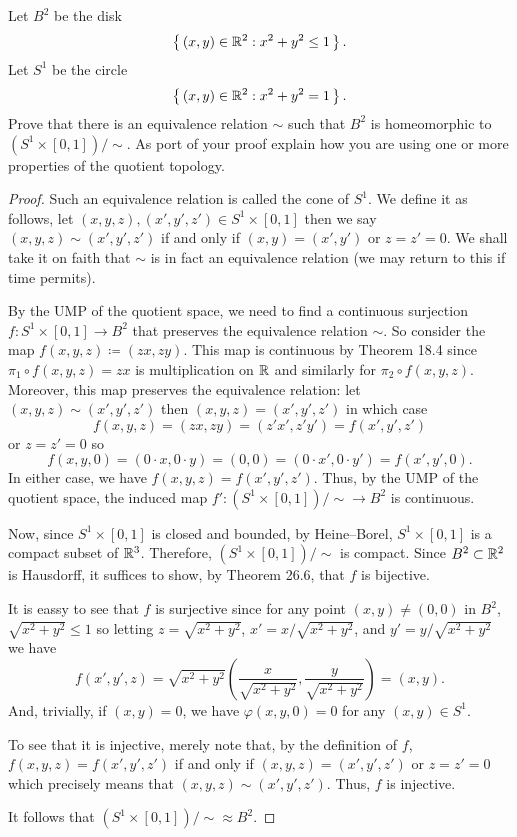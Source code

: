 \begin{problem}
Let $B^2$ be the disk
\[
\left\{\,(x,y)\in\mathbb{R}^2:x^2+y^2\leq 1\,\right\}.
\]
Let $S^1$ be the circle
\[
\left\{\,(x,y)\in\mathbb{R}^2:x^2+y^2=1\,\right\}.
\]
Prove that there is an equivalence relation $\sim$ such that $B^2$ is
homeomorphic to $(S^1\times[0,1])/{\sim}$. As port of your proof explain
how you are using one or more properties of the quotient topology.
\end{problem}
\begin{proof}
Such an equivalence relation is called the cone of $S^1$. We define it as
follows, let $(x,y,z),(x',y',z')\in S^1\times[0,1]$ then we say
$(x,y,z)\sim(x',y',z')$ if and only if $(x,y)=(x',y')$ or $z=z'=0$. We
shall take it on faith that $\sim$ is in fact an equivalence relation (we
may return to this if time permits).

By the UMP of the quotient space, we need to find a continuous surjection
$f\colon S^1\times[0,1]\to B^2$ that preserves the equivalence relation
$\sim$. So consider the map $f(x,y,z)\coloneqq(zx,zy)$. This map is
continuous by Theorem 18.4 since $\pi_1\circ f(x,y,z)=zx$ is multiplication
on $\mathbb{R}$ and similarly for $\pi_2\circ f(x,y,z)$. Moreover, this map
preserves the equivalence relation: let $(x,y,z)\sim(x',y',z')$ then
$(x,y,z)=(x',y',z')$ in which case
\[
f(x,y,z)=(zx,zy)=(z'x',z'y')=f(x',y',z')
\]
or $z=z'=0$ so
\[
f(x,y,0)=(0\cdot x,0\cdot y)=(0,0)=(0\cdot x',0\cdot y')=f(x',y',0).
\]
In either case, we have $f(x,y,z)=f(x',y',z')$. Thus, by the UMP of the
quotient space, the induced map $f'\colon (S^1\times[0,1])/{\sim}\to B^2$
is continuous.

Now, since $S^1\times[0,1]$ is closed and bounded, by Heine--Borel,
$S^1\times[0,1]$ is a compact subset of $\mathbb{R}^3$. Therefore,
$(S^1\times[0,1])/{\sim}$ is compact. Since $B^2\subset\mathbb{R}^2$ is
Hausdorff, it suffices to show, by Theorem 26.6, that $f$ is bijective.

It is eassy to see that $f$ is surjective since for any point
$(x,y)\neq(0,0)$ in $B^2$, $\sqrt{x^2+y^2}\leq 1$ so letting
$z=\sqrt{x^2+y^2}$, $x'=x/\sqrt{x^2+y^2}$, and $y'=y/\sqrt{x^2+y^2}$ we
have
\[
f(x',y',z)=\sqrt{x^2+y^2}
\left(\frac{x}{\sqrt{x^2+y^2}},
\frac{y}{\sqrt{x^2+y^2}}\right)=(x,y).
\]
And, trivially, if $(x,y)=0$, we have $\varphi(x,y,0)=0$ for any $(x,y)\in
S^1$.

To see that it is injective, merely note that, by the definition of $f$,
$f(x,y,z)=f(x',y',z')$ if and only if $(x,y,z)=(x',y',z')$ or $z=z'=0$
which precisely means that $(x,y,z)\sim(x',y',z')$. Thus, $f$ is
injective.

It follows that $(S^1\times[0,1])/{\sim}\approx B^2$.
\end{proof}

